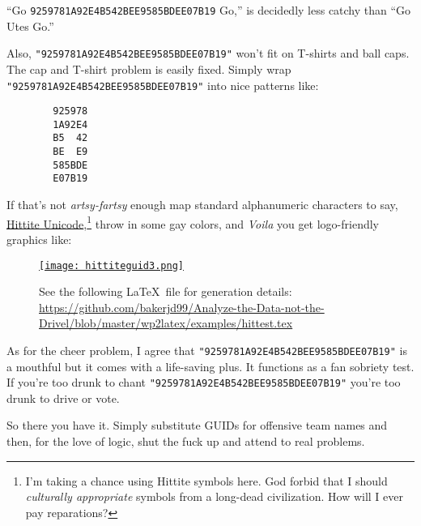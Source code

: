 ``Go \texttt{9259781A92E4B542BEE9585BDEE07B19} Go,'' is decidedly less catchy
than ``Go Utes Go.''

Also, \texttt{"9259781A92E4B542BEE9585BDEE07B19"} won't fit on T-shirts and ball
caps. The cap and T-shirt problem is easily fixed. Simply wrap
\texttt{"9259781A92E4B542BEE9585BDEE07B19"} into nice patterns like:

\begin{verbatim}
        925978
        1A92E4
        B5  42
        BE  E9
        585BDE
        E07B19
\end{verbatim}

If that's not \emph{artsy-fartsy} enough map standard alphanumeric
characters to say,
\href{https://www.hethport.uni-wuerzburg.de/cuneifont/}{Hittite
Unicode},\footnote{I'm taking a chance using Hittite symbols here. God forbid that I
should \emph{culturally appropriate} symbols from a long-dead
civilization. How will I ever pay reparations?
} throw in some gay
colors, and \emph{Voila} you get logo-friendly graphics like:


\captionsetup[figure]{labelformat=empty}
\begin{figure}[htbp]
\centering
\href{}{\texttt{[image: hittiteguid3.png]}}
\caption{See the following  \LaTeX\  file for generation details: \\ \footnotesize \url{https://github.com/bakerjd99/Analyze-the-Data-not-the-Drivel/blob/master/wp2latex/examples/hittest.tex} \normalsize}
\label{fig:7130x0}
\end{figure}


As for the cheer problem, I agree that
\texttt{"9259781A92E4B542BEE9585BDEE07B19"} is a mouthful but it comes with a
life-saving plus. It functions as a fan sobriety test. If you're too
drunk to chant \texttt{"9259781A92E4B542BEE9585BDEE07B19"} you're too drunk to
drive or vote.

So there you have it. Simply substitute GUIDs for offensive team names
and then, for the love of logic, shut the fuck up and attend to real
problems.





%
 
